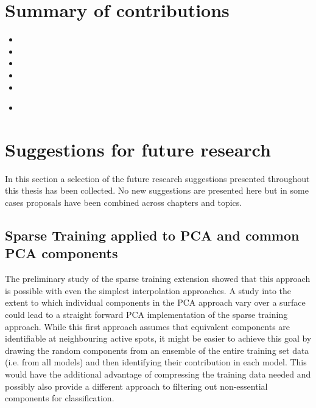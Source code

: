 \section{Summary of contributions}
\begin{itemize}
  \item %
  \item %
  \item %
  \item %
  \item %
  \item 
\end{itemize}


\section{Suggestions for future research}
In this section a selection of the future research suggestions presented throughout this thesis has been collected. No new suggestions are presented here but in some cases proposals have been combined across chapters and topics.

\subsection{Sparse Training applied to PCA and common PCA components}
The preliminary study of the sparse training extension showed that this approach is possible with even the simplest interpolation approaches. A study into the extent to which individual components in the PCA approach vary over a surface could lead to a straight forward PCA implementation of the sparse training approach. While this first approach assumes that equivalent components are identifiable at neighbouring active spots, it might be easier to achieve this goal by drawing the random components from an ensemble of the entire training set data (i.e. from all models) and then identifying their contribution in each model. This would have the additional advantage of compressing the training data needed and possibly also provide a different approach to filtering out non-essential components for classification.

